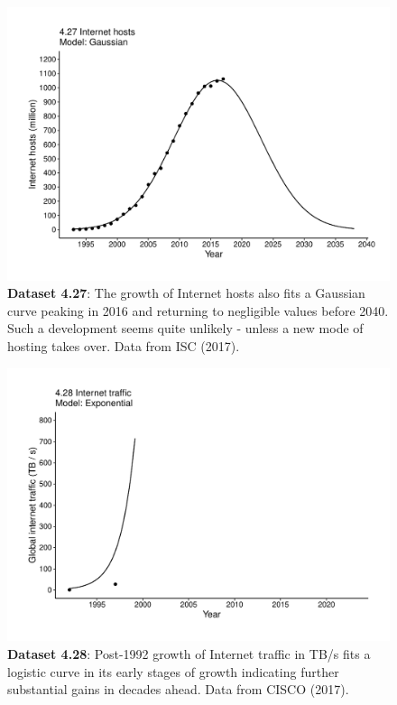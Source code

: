 \documentclass[aps,rmp,preprint,superscriptaddress,10pt,onecolumn]{article}
\begin{document}
\clearpage
\begin{figure}[h]
\includegraphics[width=\textwidth]{output/figs-ggplot/4.27.pdf}
\caption{\textbf{Dataset 4.27}: The growth of Internet hosts also fits a Gaussian curve peaking in 2016 and returning to negligible values before 2040. Such a development seems quite unlikely - unless a new mode of hosting takes over. Data from ISC (2017).}
\end{figure}
	
\clearpage
\begin{figure}[h]
\includegraphics[width=\textwidth]{output/figs-ggplot/4.28.pdf}
\caption{\textbf{Dataset 4.28}: Post-1992 growth of Internet traffic in TB/s fits a logistic curve in its early stages of growth indicating further substantial gains in decades ahead. Data from CISCO (2017).}
\end{figure}
	
\end{document}
